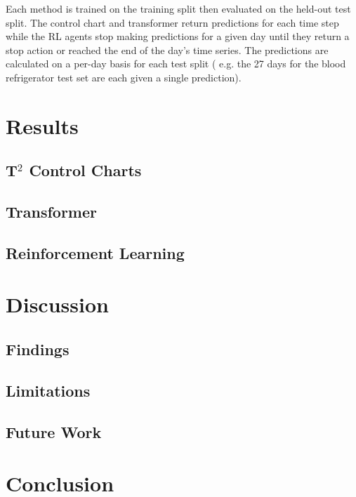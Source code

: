 \documentclass[12pt]{article}
\begin{document}
Each method is trained on the training split then evaluated on the held-out test split. The control chart and transformer
return predictions for each time step while the RL agents stop making predictions for a given day until they return a stop
action or reached the end of the day's time series. The predictions are calculated on a per-day basis for each test split (
e.g. the 27 days for the blood refrigerator test set are each given a single prediction).


\section{Results}

\subsection{T$^2$ Control Charts}

\subsection{Transformer}

\subsection{Reinforcement Learning}

\section{Discussion}

\subsection{Findings}

\subsection{Limitations}

\subsection{Future Work}



\section{Conclusion} \label{conc}



{}

\end{document}
